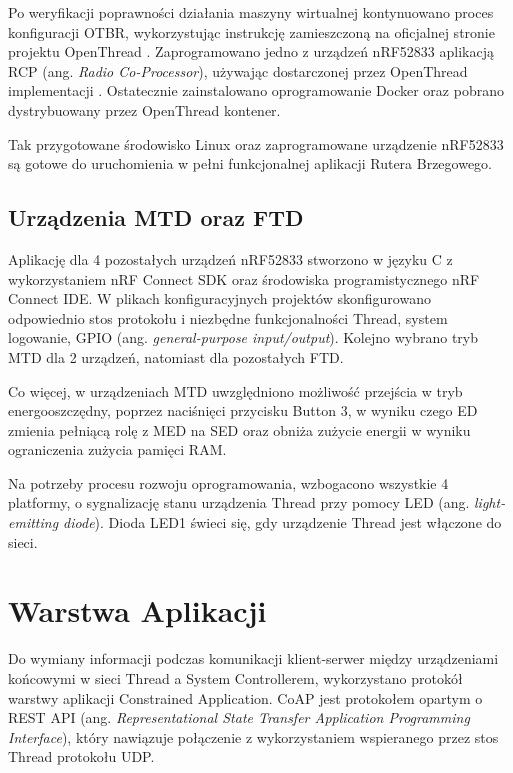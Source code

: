         Po weryfikacji poprawności działania maszyny wirtualnej kontynuowano proces konfiguracji OTBR, wykorzystując instrukcję zamieszczoną na oficjalnej stronie projektu OpenThread \cite{otbr-docker}. Zaprogramowano jedno z urządzeń nRF52833 aplikacją RCP (ang. \textit{Radio Co-Processor}), używając dostarczonej przez OpenThread implementacji \cite{otbr-rcp-app}. Ostatecznie zainstalowano oprogramowanie Docker oraz pobrano dystrybuowany przez OpenThread kontener.

        Tak przygotowane środowisko Linux oraz zaprogramowane urządzenie nRF52833 są gotowe do uruchomienia w pełni funkcjonalnej aplikacji Rutera Brzegowego.

    \subsection{Urządzenia MTD oraz FTD}
    \label{subsubsec:mtd-ftd-devices-implementation}

    Aplikację dla 4 pozostałych urządzeń nRF52833 stworzono w języku C z wykorzystaniem nRF Connect SDK oraz środowiska programistycznego nRF Connect IDE. W plikach konfiguracyjnych projektów skonfigurowano odpowiednio stos protokołu i niezbędne funkcjonalności Thread, system logowanie, GPIO (ang. \textit{general-purpose input/output}). Kolejno wybrano tryb MTD dla 2 urządzeń, natomiast dla pozostałych FTD. 

    Co więcej, w urządzeniach MTD uwzględniono możliwość przejścia w tryb energooszczędny, poprzez naciśnięci przycisku Button 3, w wyniku czego ED zmienia pełniącą rolę z MED na SED oraz obniża zużycie energii w wyniku ograniczenia zużycia pamięci RAM.

    Na potrzeby procesu rozwoju oprogramowania, wzbogacono wszystkie 4 platformy, o sygnalizację stanu urządzenia Thread przy pomocy LED (ang. \textit{light-emitting diode}). Dioda LED1 świeci się, gdy urządzenie Thread jest włączone do sieci.
    
\section{Warstwa Aplikacji}

    Do wymiany informacji podczas komunikacji klient-serwer między urządzeniami końcowymi w sieci Thread a System Controllerem, wykorzystano protokół warstwy aplikacji Constrained Application. CoAP jest protokołem opartym o REST API (ang. \textit{Representational State Transfer Application Programming Interface}), który nawiązuje połączenie z wykorzystaniem wspieranego przez stos Thread protokołu UDP.

